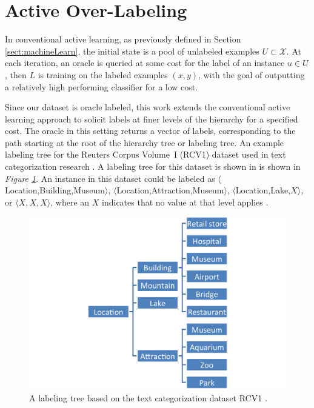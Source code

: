 \documentclass[ms]{nuthesis}
\begin{document}
\section{Active Over-Labeling}
\label{sect:activeOverLabel}
In conventional active learning, as previously defined in Section \ref{sect:machineLearn},
the initial state is a pool of unlabeled examples
$U \subset {\mathcal X}$. At each iteration, an oracle is queried at some
cost for the label of an instance $u \in U$, then $L$ is training on the labeled examples
$(x,y)$, with the goal of outputting a relatively high performing classifier for a low cost.
\par Since our dataset is oracle labeled, this work extends the conventional active
learning approach to solicit labels at finer levels of the hierarchy for a specified cost.
 The oracle in this setting returns a vector of labels, corresponding to the path starting
 at the root of the hierarchy tree or labeling tree. An example labeling tree for the
 Reuters Corpus Volume~I (RCV1) dataset used in text categorization research \cite{Lewis2004}.
 A labeling tree for this dataset is shown in is shown in
 \textit{Figure \ref{fig:exp-ontology}}. An instance in this dataset could be labeled as
 $\langle$Location,Building,Museum$\rangle$,  $\langle$Location,Attraction,Museum$\rangle$,
$\langle$Location,Lake,$X\rangle$, or $\langle X,X,X \rangle$, where an $X$ indicates
that no value at that level applies \cite{yugi}.

\FloatBarrier
\begin{figure}[!htb]
	\centering
    \includegraphics[width=0.85\columnwidth]{fig/exp-ontology}
    \caption{A labeling tree based on the text categorization dataset RCV1 \cite{Lewis2004}.}
    \label{fig:exp-ontology}
\end{figure}
\FloatBarrier
\end{document}
